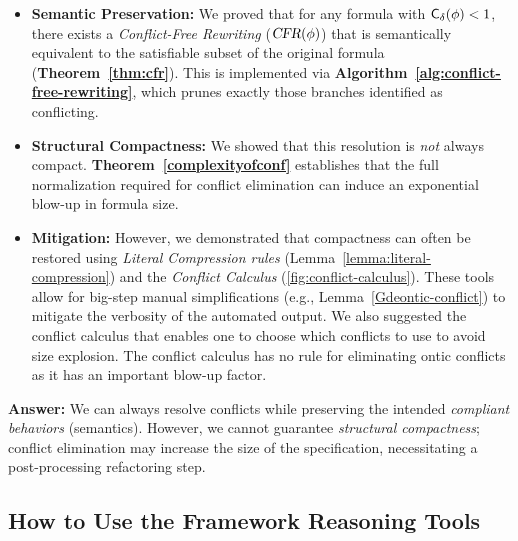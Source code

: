 \begin{itemize}
    \item \textbf{Semantic Preservation:} We proved that for any formula with $\mathsf{C_\delta} (\phi) < 1$, there exists a \emph{Conflict-Free Rewriting} ($\textsl{CFR}(\phi)$) that is semantically equivalent to the satisfiable subset of the original formula (\textbf{Theorem~\ref{thm:cfr}}). This is implemented via \textbf{Algorithm~\ref{alg:conflict-free-rewriting}}, which prunes exactly those branches identified as conflicting.
    
    \item \textbf{Structural Compactness:} We showed that this resolution is \emph{not} always compact. \textbf{Theorem~\ref{complexityofconf}} establishes that the full normalization required for conflict elimination can induce an exponential blow-up in formula size.
    
    \item \textbf{Mitigation:} However, we demonstrated that compactness can often be restored using \emph{Literal Compression rules} (Lemma~\ref{lemma:literal-compression}) and the \emph{Conflict Calculus} (\ref{fig:conflict-calculus}). These tools allow for big-step manual simplifications (e.g., Lemma~\ref{Gdeontic-conflict}) to mitigate the verbosity of the automated output. We also suggested the conflict calculus that enables one to choose which conflicts to use to avoid size explosion. The conflict calculus has no rule for eliminating ontic conflicts as it has an important blow-up factor.
\end{itemize}

\noindent \textbf{Answer:} We can always resolve conflicts while preserving the intended \emph{compliant behaviors} (semantics). However, we cannot guarantee \emph{structural compactness}; conflict elimination may increase the size of the specification, necessitating a post-processing refactoring step.
        
        
        \subsection{How to Use the Framework Reasoning Tools}
        
